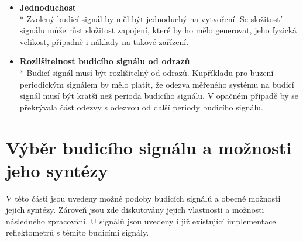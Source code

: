 \begin{itemize}
	\item
	\textbf{Jednoduchost}\\*	
	Zvolený budicí signál by měl být jednoduchý na vytvoření. Se složitostí signálu může růst složitost zapojení, které by ho mělo generovat, jeho fyzická velikost, případně i náklady na takové zařízení.	

	\item
	\textbf{Rozlišitelnost budicího signálu od odrazů}\\*	
	Budicí signál musí být rozlišitelný od odrazů. Kupříkladu pro buzení periodickým signálem by mělo platit, že odezva měřeného systému na budicí signál musí být kratší než perioda budicího signálu. V opačném případě by se překrývala část odezvy s odezvou od další periody budicího signálu.
\end{itemize}

\section{Výběr budicího signálu a možnosti jeho syntézy}
V této části jsou uvedeny možné podoby budicích signálů a obecné možnosti jejich syntézy. Zároveň jsou zde diskutovány jejich vlastnosti a možnosti následného zpracování. U signálů jsou uvedeny i již existující implementace reflektometrů s těmito budicími signály.

